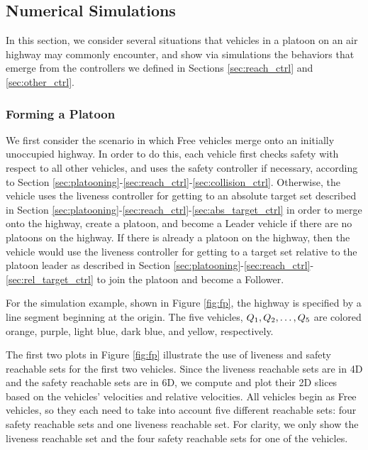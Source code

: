 \subsection{Numerical Simulations}
In this section, we consider several situations that vehicles in a platoon on an air highway may commonly encounter, and show via simulations the behaviors that emerge from the controllers we defined in Sections \ref{sec:reach_ctrl} and \ref{sec:other_ctrl}.

\subsubsection{Forming a Platoon}
We first consider the scenario in which Free vehicles merge onto an initially unoccupied highway. In order to do this, each vehicle first checks safety with respect to all other vehicles, and uses the safety controller if necessary, according to Section \ref{sec:platooning}-\ref{sec:reach_ctrl}-\ref{sec:collision_ctrl}. Otherwise, the vehicle uses the liveness controller for getting to an absolute target set described in Section \ref{sec:platooning}-\ref{sec:reach_ctrl}-\ref{sec:abs_target_ctrl} in order to merge onto the highway, create a platoon, and become a Leader vehicle if there are no platoons on the highway. If there is already a platoon on the highway, then the vehicle would use the liveness controller for getting to a target set relative to the platoon leader as described in Section \ref{sec:platooning}-\ref{sec:reach_ctrl}-\ref{sec:rel_target_ctrl} to join the platoon and become a Follower.

For the simulation example, shown in Figure \ref{fig:fp}, the highway is specified by a line segment beginning at the origin. The five vehicles, $Q_{1}, Q_{2}, \ldots, Q_{5}$ are colored orange, purple, light blue, dark blue, and yellow, respectively.

The first two plots in Figure \ref{fig:fp} illustrate the use of liveness and safety reachable sets for the first two vehicles. Since the liveness reachable sets are in 4D and the safety reachable sets are in 6D, we compute and plot their 2D slices based on the vehicles' velocities and relative velocities.  All vehicles begin as Free vehicles, so they each need to take into account five different reachable sets: four safety reachable sets and one liveness reachable set. For clarity, we only show the liveness reachable set and the four safety reachable sets for one of the vehicles. 

